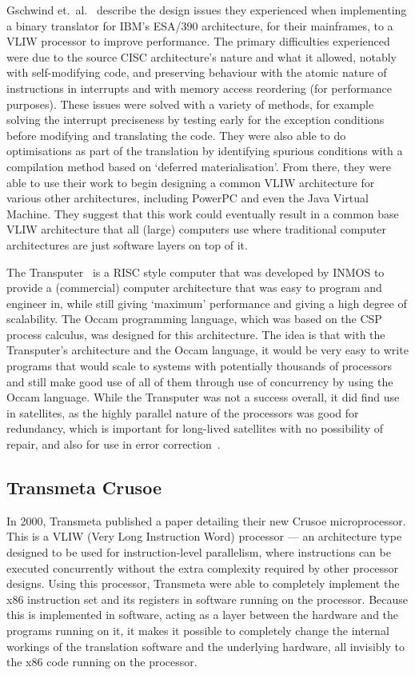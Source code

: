 Gschwind et.\ al.~\cite{Gschwind2000BinaryTranslation} describe the design
issues they experienced when implementing a binary translator for IBM's ESA/390
architecture, for their mainframes, to a VLIW processor to improve performance.
The primary difficulties experienced were due to the source CISC architecture's
nature and what it allowed, notably with self-modifying code, and preserving
behaviour with the atomic nature of instructions in interrupts and with memory
access reordering (for performance purposes). These issues were solved with a
variety of methods, for example solving the interrupt preciseness by testing
early for the exception conditions before modifying and translating the code.
They were also able to do optimisations as part of the translation by
identifying spurious conditions with a compilation method based on `deferred
materialisation'. From there, they were able to use their work to begin
designing a common VLIW architecture for various other architectures, including
PowerPC and even the Java Virtual Machine. They suggest that this work could
eventually result in a common base VLIW architecture that all (large) computers
use where traditional computer architectures are just software layers on top of
it.

The Transputer~\cite{Whitby1985Transputer} is a RISC style computer that was
developed by INMOS to provide a (commercial) computer architecture that was easy
to program and engineer in, while still giving `maximum' performance and giving
a high degree of scalability. The Occam programming language, which was based on
the CSP process calculus, was designed for this architecture.  The idea is that
with the Transputer's architecture and the Occam language, it would be very easy
to write programs that would scale to systems with potentially thousands of
processors and still make good use of all of them through use of concurrency by
using the Occam language. While the Transputer was not a success overall, it did
find use in satellites, as the highly parallel nature of the processors was good
for redundancy, which is important for long-lived satellites with no possibility
of repair, and also for use in error correction~\cite{Mattos1990Transputer}.

\subsection{Transmeta Crusoe}
In 2000, Transmeta\cite{TransmetaCodeMorph} published a paper detailing their
new Crusoe microprocessor. This is a VLIW (Very Long Instruction Word)
processor --- an architecture type designed to be used for instruction-level
parallelism, where instructions can be executed concurrently without the extra
complexity required by other processor designs. Using this processor, Transmeta
were able to completely implement the x86 instruction set and its registers in
software running on the processor. Because this is implemented in software,
acting as a layer between the hardware and the programs running on it, it makes
it possible to completely change the internal workings of the translation
software and the underlying hardware, all invisibly to the x86 code running on
the processor.

